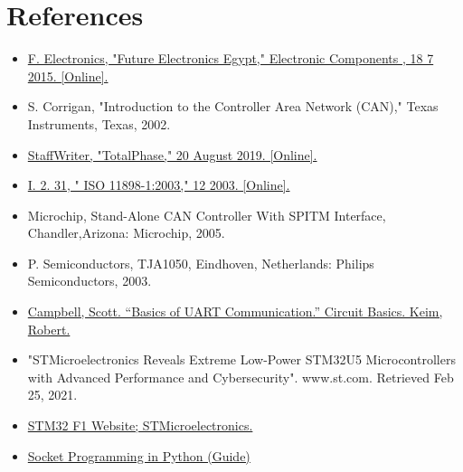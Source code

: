 \chapter{References}

\begin{itemize}
    \item \href{https://store.fut-electronics.com/products/mcp2515-can-bus-interface-module}{F. Electronics, "Future Electronics Egypt,"
Electronic Components , 18 7 2015. [Online].}
    \item S. Corrigan, "Introduction to the Controller
    Area Network (CAN)," Texas Instruments,
    Texas, 2002.
    \item \href{https://www.totalphase.com/blog/2019/08/5-advantages-of-can-bus-protocol/}{StaffWriter, "TotalPhase," 20 August 2019.
[Online].}
    \item \href{https://www.iso.org/standard/33422.html}{I. 2. 31, " ISO 11898-1:2003," 12 2003.
[Online].}
\item Microchip, Stand-Alone CAN Controller With
SPITM Interface, Chandler,Arizona: Microchip,
2005.
\item P. Semiconductors, TJA1050, Eindhoven,
Netherlands: Philips Semiconductors, 2003.
\item \href{https://www.circuitbasics.com/basics-uart-communication/}{Campbell, Scott. “Basics of UART Communication.” Circuit Basics. Keim, Robert.}
\item "STMicroelectronics Reveals Extreme Low-Power STM32U5 Microcontrollers with
Advanced Performance and Cybersecurity". www.st.com. Retrieved Feb 25, 2021.
\item \href{https://www.st.com/en/microcontrollers-microprocessors/stm32f1-series.html}{STM32 F1 Website; STMicroelectronics.}
\item \href{https://realpython.com/python-sockets/}{Socket Programming in Python (Guide)}
\end{itemize}

